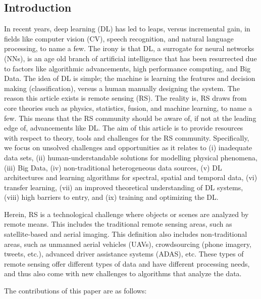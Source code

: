 \documentclass[12pt]{spieman}
\newcommand{\ParSection}[1]{}
\begin{document}
\begin{spacing}{1}    %


\section{Introduction}
\label{sec:Introduction}

\ParSection{Motivation (DEREK-DONE)} In recent years, deep learning (DL) has led to leaps, versus incremental gain, in fields like computer vision (CV), speech recognition, and natural language processing, to name a few. The irony is that DL, a surrogate for neural networks (NNs), is an age old branch of artificial intelligence that has been resurrected due to factors like algorithmic advancements, high performance computing, and Big Data. The idea of DL is simple; the machine is learning the features and decision making (classification), versus a human manually designing the system. The reason this article exists is remote sensing (RS). The reality is, RS draws from core theories such as physics, statistics, fusion, and machine learning, to name a few. This means that the RS community should be aware of, if not at the leading edge of, advancements like DL. The aim of this article is to provide resources with respect to theory, tools and challenges for the RS community. Specifically, we focus on unsolved challenges and opportunities as it relates to (i) inadequate data sets, (ii) human-understandable solutions for modelling physical phenomena, (iii) Big Data, (iv) non-traditional heterogeneous data sources, (v) DL architectures and learning algorithms for spectral, spatial and temporal data, (vi) transfer learning, (vii) an improved theoretical understanding of DL systems, (viii) high barriers to entry, and (ix) training and optimizing the DL.

\ParSection{Define Remote Sensing (JOHN-DONE)} Herein, RS is a technological challenge where objects or scenes are analyzed by remote means. This includes the traditional remote sensing areas, such as satellite-based and aerial imaging. This definition also includes non-traditional areas, such as unmanned aerial vehicles (UAVs), crowdsourcing (phone imagery, tweets, etc.), advanced driver assistance systems (ADAS), etc. These types of remote sensing offer different types of data and have different processing needs, and thus also come with new challenges to algorithms that analyze the data.

\ParSection{Paper Contributions (JOHN-DONE)} The contributions of this paper are as follows:\\


\end{spacing}
\end{document}
